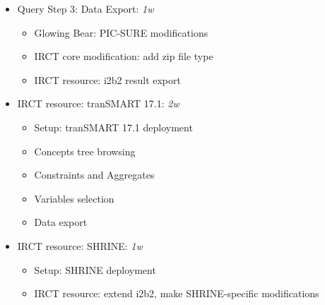 \begin{itemize}
    \item Query Step 3: Data Export: \emph{1w}
    \begin{itemize}
        \item Glowing Bear: PIC-SURE modifications
        \item IRCT core modification: add zip file type
        \item IRCT resource: i2b2 result export
    \end{itemize}

    \item IRCT resource: tranSMART 17.1: \emph{2w}
    \begin{itemize}
        \item Setup: tranSMART 17.1 deployment
        \item Concepts tree browsing
        \item Constraints and Aggregates
        \item Variables selection
        \item Data export
    \end{itemize}
    
    \item IRCT resource: SHRINE: \emph{1w}
    \begin{itemize}
        \item Setup: SHRINE deployment
        \item IRCT resource: extend i2b2, make SHRINE-specific modifications
    \end{itemize}
\end{itemize}
